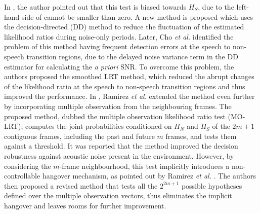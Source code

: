 In \cite{sohn1999statistical}, the author pointed out that this test is biased towards $H_S$, due to the left-hand side of  cannot be smaller than zero. A new method is proposed which uses the decision-directed (DD) method \cite{ephraim1984speech} to reduce the fluctuation of the estimated likelihood ratios during noise-only periods.
Later, Cho \emph{et al.} \cite{cho2001improved} identified the problem of this method having frequent detection errors at the speech to non-speech transition regions, due to the delayed noise variance term in the DD estimator for calculating the \emph{a priori} SNR.
To overcome this problem, the authors proposed the smoothed LRT method, which reduced the abrupt changes of the likelihood ratio at the speech to non-speech transition regions and thus improved the performance.
In \cite{ramirez2005statistical}, Ramirez \emph{et al.} extended the method even further by incorporating multiple observation from the neighbouring frames.
The proposed method, dubbed the multiple observation likelihood ratio test (MO-LRT), computes the joint probabilities conditioned on $H_N$ and $H_S$ of the $2m+1$ contiguous frames, including the past and future $m$ frames, and tests them against a threshold.
It was reported that the method improved the decision robustness against acoustic noise present in the environment.
However, by considering the $m$-frame neighbourhood, this test implicitly introduces a non-controllable hangover mechanism, as pointed out by Ramirez \emph{et al.} \cite{ramirez2007improved}.
The authors then proposed a revised method that tests all the $2^{2m+1}$ possible hypotheses defined over the multiple observation vectors, thus eliminates the implicit hangover and leaves rooms for further improvement.

